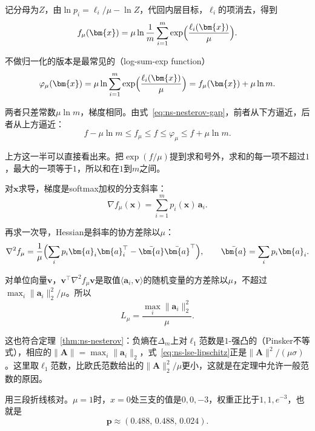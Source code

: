 记分母为$Z$，由$\ln p_i=\ell_i/\mu-\ln Z$，代回内层目标，$\ell_i$的项消去，得到
\begin{equation}
 f_\mu(\bm{x})=\mu\ln\frac{1}{m}\sum_{i=1}^m\exp\Bigl(\frac{\ell_i(\bm{x})}{\mu}\Bigr).
 \label{eq:ns-lse-lower}
\end{equation}

不做归一化的版本是最常见的（log-sum-exp function）
\begin{equation}
 \varphi_\mu(\bm{x})=\mu\ln\sum_{i=1}^m\exp\Bigl(\frac{\ell_i(\bm{x})}{\mu}\Bigr)=f_\mu(\bm{x})+\mu\ln m.
 \label{eq:ns-lse-upper}
\end{equation}

两者只差常数$\mu\ln m$，梯度相同。由式~\eqref{eq:ns-nesterov-gap}，前者从下方逼近，后者从上方逼近：
\begin{equation}
 f-\mu\ln m\leq f_\mu\leq f\leq\varphi_\mu\leq f+\mu\ln m.
 \label{eq:ns-lse-gap}
\end{equation}

上方这一半可以直接看出来。把$\exp(f/\mu)$提到求和号外，求和的每一项不超过$1$，最大的一项等于$1$，所以和在$1$到$m$之间。

对$\bm{x}$求导，梯度是softmax加权的分支斜率：
\begin{equation}
 \nabla f_\mu(\bm{x})=\sum_{i=1}^mp_i(\bm{x})\,\bm{a}_i.
 \label{eq:ns-lse-grad}
\end{equation}

再求一次导，Hessian是斜率的协方差除以$\mu$：
\[
 \nabla^2f_\mu=\frac1\mu\Bigl(\sum_ip_i\bm{a}_i\bm{a}_i^\top-\bar{\bm{a}}\bar{\bm{a}}^\top\Bigr),\qquad\bar{\bm{a}}=\sum_ip_i\bm{a}_i.
\]

对单位向量$\bm{v}$，$\bm{v}^\top\nabla^2f_\mu\bm{v}$是取值$\langle\bm{a}_i,\bm{v}\rangle$的随机变量的方差除以$\mu$，不超过$\max_i\lVert\bm{a}_i\rVert_2^2/\mu$。所以
\begin{equation}
 L_\mu=\frac{\max_i\lVert\bm{a}_i\rVert_2^2}{\mu}.
 \label{eq:ns-lse-lipschitz}
\end{equation}

这也符合定理~\ref{thm:ns-nesterov}：负熵在$\Delta_m$上对$\ell_1$范数是$1$-强凸的（Pinsker不等式），相应的$\lVert\bm{A}\rVert=\max_i\lVert\bm{a}_i\rVert_2$，式~\eqref{eq:ns-lse-lipschitz}正是$\lVert\bm{A}\rVert^2/(\mu\sigma)$。这里取$\ell_1$范数，比欧氏范数给出的$\lVert\bm{A}\rVert_2^2/\mu$更小，这就是在定理中允许一般范数的原因。

用三段折线核对。$\mu=1$时，$x=0$处三支的值是$0,0,-3$，权重正比于$1,1,e^{-3}$，也就是
\[
 \bm{p}\approx(0.488,\,0.488,\,0.024).
\]

